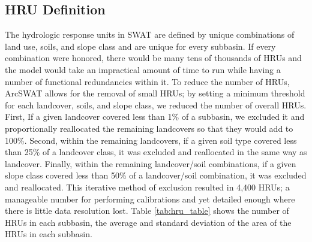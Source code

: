\subsection{HRU Definition}\label{sec:hru_definition}

The hydrologic response units in SWAT are defined by unique combinations of land use, soils, and slope class and are unique for every subbasin. If every combination were honored, there would be many tens of thousands of HRUs and the model would take an impractical amount of time to run while having a number of functional redundancies within it. To reduce the number of HRUs, ArcSWAT allows for the removal of small HRUs; by setting a minimum threshold for each landcover, soils, and slope class, we reduced the number of overall HRUs. First, If a given landcover covered less than 1\% of a subbasin, we excluded it and proportionally reallocated the remaining landcovers so that they would add to 100\%.  Second, within the remaining landcovers, if a given soil type covered less than 25\% of a landcover class, it was excluded and reallocated in the same way as landcover. Finally, within the remaining landcover/soil combinations, if a given slope class covered less than 50\% of a landcover/soil combination, it was excluded and reallocated. This iterative method of exclusion resulted in 4,400 HRUs; a manageable number for performing calibrations and yet detailed enough where there is little data resolution lost. Table \ref{tab:hru_table} shows the number of HRUs in each subbasin, the average and standard deviation of the area of the HRUs in each subbasin.